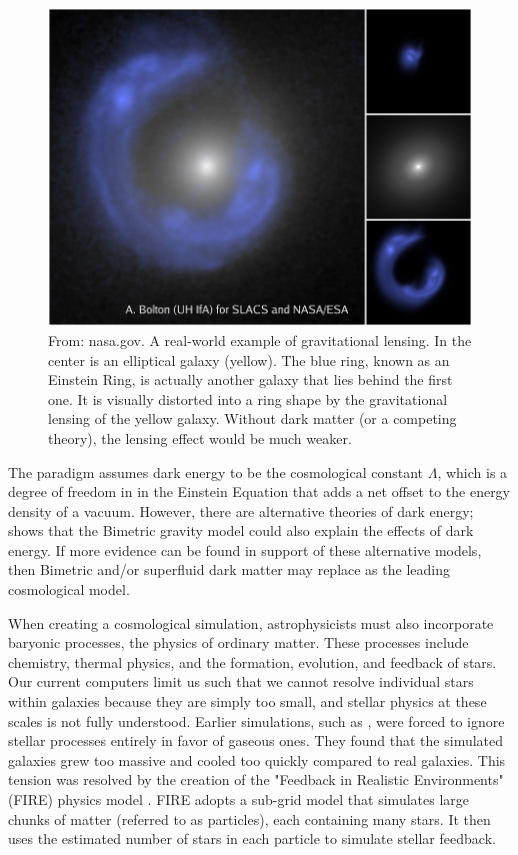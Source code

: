 \begin{figure}
    \centering
    \includegraphics*[width=\textwidth*2/3]{figs/gravity_lensing.jpg}
    
    \caption{From: nasa.gov. A real-world example of gravitational lensing. In the center is an elliptical galaxy (yellow). The blue ring, known as an Einstein Ring, is actually another galaxy that lies behind the first one. It is visually distorted into a ring shape by the gravitational lensing of the yellow galaxy. Without dark matter (or a competing theory), the lensing effect would be much weaker.}
    \label{fig:grav-lensing}
\end{figure}

The \lcdm\* paradigm assumes dark energy to be the cosmological constant $\Lambda$, which is a degree of freedom in in the Einstein Equation that adds a net offset to the energy density of a vacuum. However, there are alternative theories of dark energy; \cite{bassiCosmologicalEvolutionBimetric2023} shows that the Bimetric gravity model could also explain the effects of dark energy. If more evidence can be found in support of these alternative models, then Bimetric and/or superfluid dark matter may replace \lcdm\space as the leading cosmological model.

When creating a cosmological simulation, astrophysicists must also incorporate baryonic processes, the physics of ordinary matter. These processes include chemistry, thermal physics, and the formation, evolution, and feedback of stars. Our current computers limit us such that we cannot resolve individual stars within galaxies \citep{feldmannFIREboxSimulatingGalaxies2022} because they are simply too small, and stellar physics at these scales is not fully understood. Earlier simulations, such as \cite{bournaudISMPropertiesHydrodynamic2010}, were forced to ignore stellar processes entirely in favor of gaseous ones. They found that the simulated galaxies grew too massive and cooled too quickly compared to real galaxies. This tension was resolved by the creation of the "Feedback in Realistic Environments" (FIRE) physics model \citep{hopkinsFIRE2SimulationsPhysics2018}. FIRE adopts a sub-grid model that simulates large chunks of matter (referred to as particles), each containing many stars. It then uses the estimated number of stars in each particle to simulate stellar feedback. 

